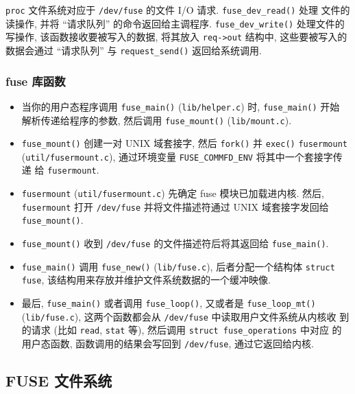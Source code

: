 \documentclass[nofonts, titlepage]{ctexart}
\begin{document}
\texttt{proc} 文件系统对应于 \texttt{/dev/fuse} 的文件 I/O 请求.
\texttt{fuse\_dev\_read()} 处理 文件的读操作, 并将 ``请求队列''
的命令返回给主调程序. \texttt{fuse\_dev\_write()} 处理文件的写操作,
该函数接收要被写入的数据, 将其放入 \texttt{req-\textgreater{}out}
结构中, 这些要被写入的数据会通过 ``请求队列'' 与
\texttt{request\_send()} 返回给系统调用.

\subsubsection{fuse 库函数}\label{fuse-ux5e93ux51fdux6570}

\begin{itemize}
\item
  当你的用户态程序调用 \texttt{fuse\_main()} (\texttt{lib/helper.c}) 时,
  \texttt{fuse\_main()} 开始 解析传递给程序的参数, 然后调用
  \texttt{fuse\_mount()} (\texttt{lib/mount.c}).
\item
  \texttt{fuse\_mount()} 创建一对 UNIX 域套接字, 然后 \texttt{fork()} 并
  \texttt{exec()} \texttt{fusermount} (\texttt{util/fusermount.c}),
  通过环境变量 \texttt{FUSE\_COMMFD\_ENV} 将其中一个套接字传递 给
  \texttt{fusermount}.
\item
  \texttt{fusermount} (\texttt{util/fusermount.c}) 先确定 fuse
  模块已加载进内核. 然后, \texttt{fusermount} 打开 \texttt{/dev/fuse}
  并将文件描述符通过 UNIX 域套接字发回给 \texttt{fuse\_mount()}.
\item
  \texttt{fuse\_mount()} 收到 \texttt{/dev/fuse}
  的文件描述符后将其返回给 \texttt{fuse\_main()}.
\item
  \texttt{fuse\_main()} 调用 \texttt{fuse\_new()} (\texttt{lib/fuse.c}),
  后者分配一个结构体 \texttt{struct fuse},
  该结构用来存放并维护文件系统数据的一个缓冲映像.
\item
  最后, \texttt{fuse\_main()} 或者调用 \texttt{fuse\_loop()}, 又或者是
  \texttt{fuse\_loop\_mt()} (\texttt{lib/fuse.c}), 这两个函数都会从
  \texttt{/dev/fuse} 中读取用户文件系统从内核收 到的请求 (比如
  \texttt{read}, \texttt{stat} 等), 然后调用
  \texttt{struct fuse\_operations} 中对应 的用户态函数,
  函数调用的结果会写回到 \texttt{/dev/fuse}, 通过它返回给内核.
\end{itemize}

\subsection{FUSE 文件系统}
\label{fuse-ux6587ux4ef6ux7cfbux7edfux7b80ux4ecb}
\end{document}
